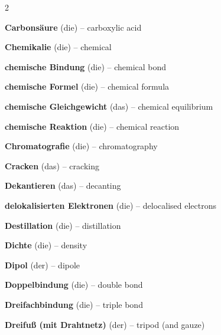 \begin{multicols}{2}
\par\nopagebreak
\textbf{Carbonsäure} (die) -- carboxylic acid\dotfill\hyperref[e:223]{\pageref*{e:223}}\par
\textbf{Chemikalie} (die) -- chemical\dotfill\hyperref[e:64]{\pageref*{e:64}}\par
\textbf{chemische Bindung} (die) -- chemical bond\dotfill\hyperref[e:105]{\pageref*{e:105}}\par
\textbf{chemische Formel} (die) -- chemical formula\dotfill\hyperref[e:101]{\pageref*{e:101}}\par
\textbf{chemische Gleichgewicht} (das) -- chemical equilibrium\dotfill\hyperref[e:145]{\pageref*{e:145}}\par
\textbf{chemische Reaktion} (die) -- chemical reaction\dotfill\hyperref[e:125]{\pageref*{e:125}}\par
\textbf{Chromatografie} (die) -- chromatography\dotfill\hyperref[e:38]{\pageref*{e:38}}\par
\textbf{Cracken} (das) -- cracking\dotfill\hyperref[e:234]{\pageref*{e:234}}\par

\par\nopagebreak
\textbf{Dekantieren} (das) -- decanting\dotfill\hyperref[e:36]{\pageref*{e:36}}\par
\textbf{delokalisierten Elektronen} (die) -- delocalised electrons\dotfill\hyperref[e:124]{\pageref*{e:124}}\par
\textbf{Destillation} (die) -- distillation\dotfill\hyperref[e:35]{\pageref*{e:35}}\par
\textbf{Dichte} (die) -- density\dotfill\hyperref[e:24]{\pageref*{e:24}}\par
\textbf{Dipol} (der) -- dipole\dotfill\hyperref[e:117]{\pageref*{e:117}}\par
\textbf{Doppelbindung} (die) -- double bond\dotfill\hyperref[e:113]{\pageref*{e:113}}\par
\textbf{Dreifachbindung} (die) -- triple bond\dotfill\hyperref[e:114]{\pageref*{e:114}}\par
\textbf{Dreifuß (mit Drahtnetz)} (der) -- tripod (and gauze)\dotfill\hyperref[e:47]{\pageref*{e:47}}\par


\end{multicols}
